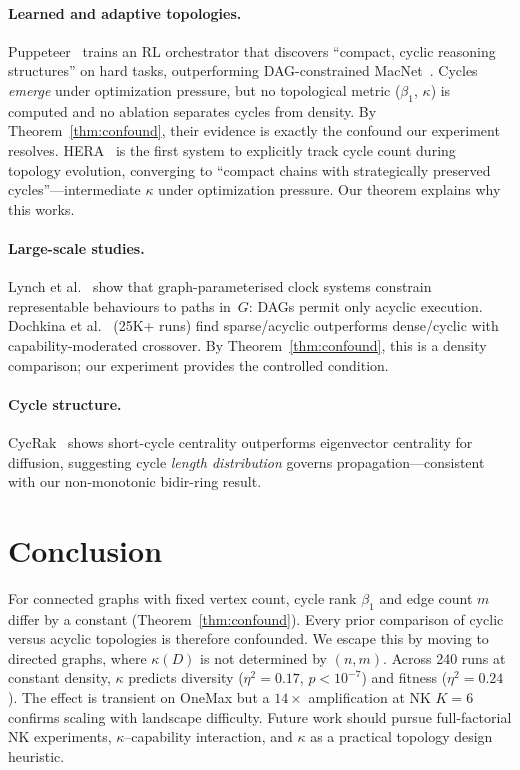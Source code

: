 \documentclass{llncs}
\begin{document}
\paragraph{Learned and adaptive topologies.}
Puppeteer~\cite{puppeteer2025} trains an RL orchestrator that discovers
``compact, cyclic reasoning structures'' on hard tasks, outperforming
DAG-constrained MacNet~\cite{macnet2025}. Cycles \emph{emerge} under
optimization pressure, but no topological metric ($\beta_1$, $\kappa$) is
computed and no ablation separates cycles from density. By
Theorem~\ref{thm:confound}, their evidence is exactly the confound our
experiment resolves. HERA~\cite{hera2026} is the first system to explicitly
track cycle count during topology evolution, converging to ``compact chains
with strategically preserved cycles''---intermediate $\kappa$ under optimization
pressure. Our theorem explains why this works.

\paragraph{Large-scale studies.}
Lynch et al.~\cite{clocksystems2026} show that graph-parameterised
clock systems constrain representable behaviours to paths in~$G$: DAGs
permit only acyclic execution. Dochkina et al.~\cite{dochkina2026}
(25K+ runs) find sparse/acyclic outperforms dense/cyclic with
capability-moderated crossover. By Theorem~\ref{thm:confound}, this is
a density comparison; our experiment provides the controlled condition.

\paragraph{Cycle structure.}
CycRak~\cite{cycrak2024} shows short-cycle centrality outperforms eigenvector
centrality for diffusion, suggesting cycle \emph{length distribution} governs
propagation---consistent with our non-monotonic bidir-ring result.

\section{Conclusion}
\label{sec:conclusion}

For connected graphs with fixed vertex count, cycle rank $\beta_1$ and edge
count $m$ differ by a constant (Theorem~\ref{thm:confound}). Every prior
comparison of cyclic versus acyclic topologies is therefore confounded. We
escape this by moving to directed graphs, where $\kappa(D)$ is not determined
by $(n, m)$. Across 240 runs at constant density, $\kappa$ predicts diversity
($\eta^2 = 0.17$, $p < 10^{-7}$) and fitness ($\eta^2 = 0.24$). The effect is
transient on OneMax but a $14\times$ amplification at NK $K = 6$ confirms
scaling with landscape difficulty. Future work should pursue full-factorial NK
experiments, $\kappa$--capability interaction, and $\kappa$ as a practical
topology design heuristic.



\end{document}
